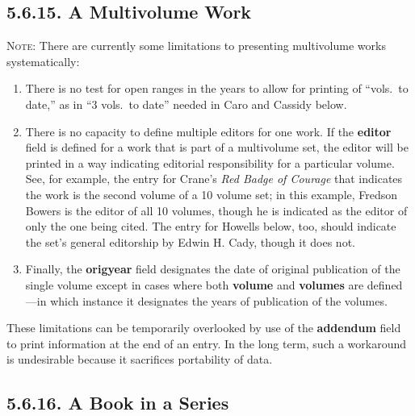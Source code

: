 \documentclass[12pt]{article}
\begin{document}
\subsection*{5.6.15. A Multivolume Work}
\newrefsegment
\textsc{Note:} There are currently some limitations to presenting multivolume works systematically:
\begin{enumerate}
\item There is no test for open ranges in the years to allow for printing of ``vols.\ to date,'' as in ``3 vols.\ to date'' needed in Caro and Cassidy below.
\item There is no capacity to define multiple editors for one work.  If the \textbf{editor} field is defined for a work that is part of a multivolume set, the editor will be printed in a way indicating editorial responsibility for a particular volume.  See, for example, the entry for Crane's \emph{Red Badge of Courage} that indicates the work is the second volume of a 10 volume set; in this example, Fredson Bowers is the editor of all 10 volumes, though he is indicated as the editor of only the one being cited.  The entry for Howells below, too, should indicate the set's general editorship by Edwin H. Cady, though it does not.
\item Finally, the \textbf{origyear} field designates the date of original publication of the single volume except in cases where both \textbf{volume} and \textbf{volumes} are defined---in which instance it designates the years of publication of the volumes.
\end{enumerate}
These limitations can be temporarily overlooked by use of the \textbf{addendum} field to print information at the end of an entry.  In the long term, such a workaround is undesirable because it sacrifices portability of data.

\nocite{howells68aa}\nocite{crane69ab}\nocite{durant65ac}\nocite{churchill57ab}\nocite{caro02ab}\nocite{durant65ab}\nocite{churchill57aa}\nocite{caro02aa}\nocite{wellek86aa}\nocite{stowe02ab}\nocite{doyle93ac}\nocite{stowe02aa}\nocite{lawrence00aa}\nocite{doyle93ab}\nocite{wellek55aa}\nocite{boulton79aa}\nocite{crane69aa}\nocite{churchill56aa}\nocite{cassidy85aa}\nocite{schlesinger73aa}\nocite{sadie80aa}\nocite{rampersand02aa}\nocite{lauter02aa}\nocite{doyle93aa}\nocite{blanco93aa}

\printbibliography[heading=blank,segment=15]

\subsection*{5.6.16. A Book in a Series}
\newrefsegment
\end{document}
